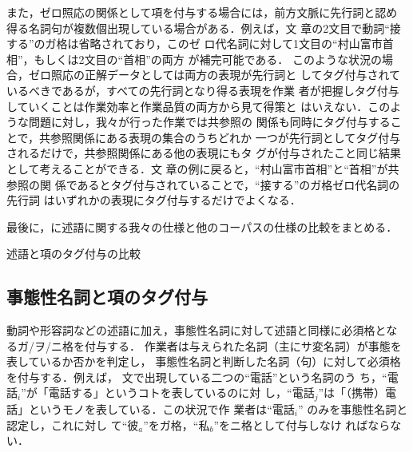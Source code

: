 \documentclass[japanese]{jnlp_1.4}
\def\tab#1{}
\begin{document}
また，ゼロ照応の関係として項を付与する場合には，前方文脈に先行詞と認め
得る名詞句が複数個出現している場合がある．例えば，文
章の2文目で動詞``接する''のガ格は省略されており，このゼ
ロ代名詞に対して1文目の``村山富市首相''，もしくは2文目の``首相''の両方
が補完可能である．
このような状況の場合，ゼロ照応の正解データとしては両方の表現が先行詞と
してタグ付与されているべきであるが，すべての先行詞となり得る表現を作業
者が把握しタグ付与していくことは作業効率と作業品質の両方から見て得策と
はいえない．このような問題に対し，我々が行った作業では共参照の
関係も同時にタグ付与することで，共参照関係にある表現の集合のうちどれか
一つが先行詞としてタグ付与されるだけで，共参照関係にある他の表現にもタ
グが付与されたこと同じ結果として考えることができる．文
章の例に戻ると，``村山富市首相''と``首相''が共参照の関
係であるとタグ付与されていることで，``接する''のガ格ゼロ代名詞の先行詞
はいずれかの表現にタグ付与するだけでよくなる．


最後に，\tab{comp_pred}に述語に関する我々の仕様と他のコーパスの仕様の比較をまとめる．


\begin{table}[t]
  \caption{述語と項のタグ付与の比較}
  \label{tab:comp_pred}

\end{table}



\subsection{事態性名詞と項のタグ付与}
\label{ssec:spec_event}

動詞や形容詞などの述語に加え，事態性名詞に対して述語と同様に必須格とな
るガ/ヲ/ニ格を付与する．
作業者は与えられた名詞（主にサ変名詞）が事態を表しているか否かを判定し，
事態性名詞と判断した名詞（句）に対して必須格を付与する．例えば，
文で出現している二つの``電話''という名詞のう
ち，``電話$_i$''が「電話する」というコトを表しているのに対
し，\mbox{``電話$_j$''}は「（携帯）電話」というモノを表している．この状況で作
業者は``電話$_i$'' のみを事態性名詞と認定し，これに対し
て``\nobreak 彼\nobreak $_a$''をガ格，``私$_b$''をニ格として付与しなけ
ればならない．
\end{document}
